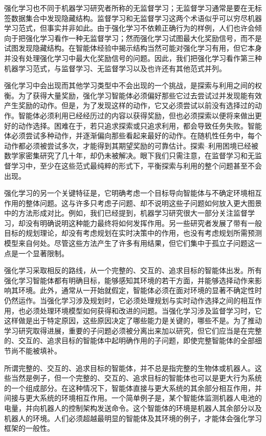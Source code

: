 \documentclass[UTF8,12pt,a4paper,fontset=fandol]{ctexart}
\begin{document}
强化学习也不同于机器学习研究者所称的无监督学习；无监督学习通常是要在无标签数据集合中发现隐藏结构。监督学习和无监督学习这两个术语似乎可以穷尽机器学习范式，但事实并非如此。由于强化学习不依赖正确行为的样例，人们也许会倾向于把强化学习看作一种无监督学习；然而强化学习试图最大化奖励信号，而不是试图发现隐藏结构。在智能体经验中揭示结构当然可能对强化学习有用，但它本身并没有处理强化学习中最大化奖励信号的问题。因此，我们把强化学习看作第三种机器学习范式，与监督学习、无监督学习以及也许还有其他范式并列。

强化学习中会出现而其他学习类型中不会出现的一个挑战，是探索与利用之间的权衡。为了获得大量奖励，强化学习智能体必须偏好那些它过去尝试过并发现能有效产生奖励的动作。但是，为了发现这样的动作，它又必须尝试以前没有选择过的动作。智能体必须利用已经经历过的内容以获得奖励，但也必须探索以便将来做出更好的动作选择。困难在于，若只追求探索或只追求利用，都会导致任务失败。智能体必须尝试多种动作，并逐渐偏向那些看起来最好的动作。在随机性任务中，每个动作都必须被尝试多次，才能得到其期望奖励的可靠估计。探索--利用困境已经被数学家密集研究了几十年，却仍未被解决。眼下我们只需注意，在监督学习和无监督学习中，至少在这些范式最纯粹的形式下，平衡探索与利用的整个问题甚至不会出现。

强化学习的另一个关键特征是，它明确考虑一个目标导向智能体与不确定环境相互作用的整体问题。这与许多只考虑子问题、却不说明这些子问题如何放入更大图景中的方法形成对比。例如，我们已经提到，机器学习研究很大一部分关注监督学习，却没有明确说明这种能力最终将如何发挥作用。另一些研究者发展了带有一般目标的规划理论，却没有考虑规划在实时决策中的作用，也没有考虑规划所需预测模型来自何处。尽管这些方法产生了许多有用结果，但它们集中于孤立子问题这一点是一个显著限制。

强化学习采取相反的路线，从一个完整的、交互的、追求目标的智能体出发。所有强化学习智能体都有明确目标，能够感知其环境的若干方面，并能够选择动作来影响其环境。此外，通常从一开始就假定，智能体必须在面对环境的显著不确定性时仍然运作。当强化学习涉及规划时，它必须处理规划与实时动作选择之间的相互作用，也必须处理环境模型如何获得和改进的问题。当强化学习涉及监督学习时，它这样做是出于特定原因，这些原因决定了哪些能力是关键的，哪些不是。为了推动学习研究取得进展，重要的子问题必须被分离出来加以研究，但它们应当是在完整的、交互的、追求目标的智能体中起明确作用的子问题，即使完整智能体的全部细节尚不能被填补。

所谓完整的、交互的、追求目标的智能体，并不总是指完整的生物体或机器人。这些当然是例子，但一个完整的、交互的、追求目标的智能体也可以是更大行为系统的一个组成部分。在这种情况下，智能体直接与更大系统的其余部分相互作用，并间接与更大系统的环境相互作用。一个简单例子是，某个智能体监测机器人电池的电量，并向机器人的控制架构发送命令。这个智能体的环境是机器人其余部分以及机器人的环境。人们必须超越最明显的智能体及其环境的例子，才能体会强化学习框架的一般性。
\end{document}
